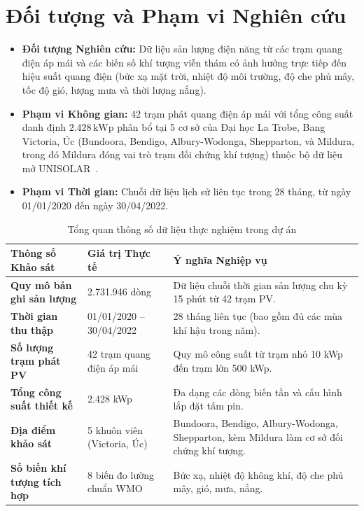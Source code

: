 \documentclass[12pt, a4paper]{report}
\begin{document}
\section{Đối tượng và Phạm vi Nghiên cứu}
\label{sec:phamvi}

\begin{itemize}[noitemsep]
    \item \textbf{Đối tượng Nghiên cứu:} Dữ liệu sản lượng điện năng từ các trạm quang điện áp mái và các biến số khí tượng viễn thám có ảnh hưởng trực tiếp đến hiệu suất quang điện (bức xạ mặt trời, nhiệt độ môi trường, độ che phủ mây, tốc độ gió, lượng mưa và thời lượng nắng).
    \item \textbf{Phạm vi Không gian:} 42 trạm phát quang điện áp mái với tổng công suất danh định $2.428\,\text{kWp}$ phân bổ tại 5 cơ sở của Đại học La Trobe, Bang Victoria, Úc (Bundoora, Bendigo, Albury-Wodonga, Shepparton, và Mildura, trong đó Mildura đóng vai trò trạm đối chứng khí tượng) thuộc bộ dữ liệu mở UNISOLAR~\cite{wimalaratne2022unisolar}.
    \item \textbf{Phạm vi Thời gian:} Chuỗi dữ liệu lịch sử liên tục trong 28 tháng, từ ngày 01/01/2020 đến ngày 30/04/2022.
\end{itemize}

\begin{table}[H]
\centering
\caption{Tổng quan thông số dữ liệu thực nghiệm trong dự án}
\label{tab:dataset_summary}
\small
\renewcommand{\arraystretch}{1.25}
\begin{tabularx}{\textwidth}{@{} l l X @{}}
\toprule
\textbf{Thông số Khảo sát} & \textbf{Giá trị Thực tế} & \textbf{Ý nghĩa Nghiệp vụ} \\
\midrule
\textbf{Quy mô bản ghi sản lượng} & 2.731.946 dòng & Dữ liệu chuỗi thời gian sản lượng chu kỳ 15 phút từ 42 trạm PV. \\
\textbf{Thời gian thu thập} & 01/01/2020 -- 30/04/2022 & 28 tháng liên tục (bao gồm đủ các mùa khí hậu trong năm). \\
\textbf{Số lượng trạm phát PV} & 42 trạm quang điện áp mái & Quy mô công suất từ trạm nhỏ 10 kWp đến trạm lớn 500 kWp. \\
\textbf{Tổng công suất thiết kế} & 2.428 kWp & Đa dạng các dòng biến tần và cấu hình lắp đặt tấm pin. \\
\textbf{Địa điểm khảo sát} & 5 khuôn viên (Victoria, Úc) & Bundoora, Bendigo, Albury-Wodonga, Shepparton, kèm Mildura làm cơ sở đối chứng khí tượng. \\
\textbf{Số biến khí tượng tích hợp} & 8 biến đo lường chuẩn WMO & Bức xạ, nhiệt độ không khí, độ che phủ mây, gió, mưa, nắng. \\
\bottomrule
\end{tabularx}


\end{table}
\end{document}
